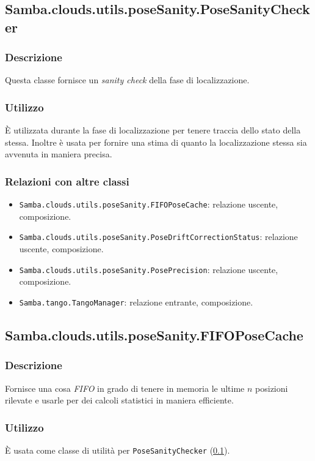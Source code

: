 \subsection{Samba.clouds.utils.poseSanity.PoseSanityChecker}
\label{class:PoseSanityChecker}
\subsubsection{Descrizione}
Questa classe fornisce un \emph{sanity check} della fase di localizzazione.
\subsubsection{Utilizzo}
È utilizzata durante la fase di localizzazione per tenere traccia dello stato della stessa. Inoltre è usata per fornire una stima di quanto la localizzazione stessa sia avvenuta in maniera precisa.
\subsubsection{Relazioni con altre classi}
\begin{itemize}
	\item \texttt{Samba.clouds.utils.poseSanity.FIFOPoseCache}: relazione uscente, composizione.
	\item \texttt{Samba.clouds.utils.poseSanity.PoseDriftCorrectionStatus}: relazione uscente, composizione.
	\item \texttt{Samba.clouds.utils.poseSanity.PosePrecision}: relazione uscente, composizione.
	\item \texttt{Samba.tango.TangoManager}: relazione entrante, composizione.
\end{itemize}

\subsection{Samba.clouds.utils.poseSanity.FIFOPoseCache}
\subsubsection{Descrizione}
Fornisce una cosa \emph{FIFO} in grado di tenere in memoria le ultime $n$ posizioni rilevate e usarle per dei calcoli statistici in maniera efficiente.
\subsubsection{Utilizzo}
È usata come classe di utilità per \texttt{PoseSanityChecker} (\ref{class:PoseSanityChecker}).
